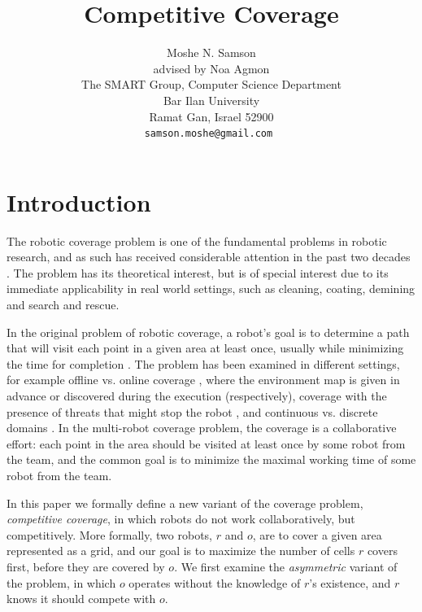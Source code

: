 \documentclass[a4paper,10pt]{article}
\newcommand\rob{\ensuremath{r}\xspace}
\newcommand\opp{\ensuremath{o}\xspace}
\begin{document}
\title{Competitive Coverage}
\author{Moshe N. Samson\\
advised by Noa Agmon\\
The SMART Group, Computer Science Department\\
Bar Ilan University\\
Ramat Gan, Israel 52900\\
\tt\small samson.moshe@gmail.com
}



\tableofcontents
\maketitle

\section{Introduction}
The robotic coverage problem is one of the fundamental problems in robotic research, and as such has received considerable attention in the past two decades \cite{galceran2013survey}. The problem has its theoretical interest, but is of special interest due to its immediate applicability in real world settings, such as cleaning, coating, demining and search and rescue. 

In the original problem of robotic coverage, a robot's goal is to determine a path that will visit each point in a given area at least once, usually while minimizing the time for completion \cite{galceran2013survey}. The problem has been examined in different settings, for example offline vs. online coverage \cite{gabriely2001spanning,agmon2008giving}, where the environment map is given in advance or discovered during the execution (respectively), coverage with the presence of threats that might stop the robot \cite{yehoshua2014safest}, and continuous vs. discrete domains \cite{gabriely2001spanning,yang2004neural}. In the multi-robot coverage problem, the coverage is a collaborative effort: each point in the area should be visited at least once by some robot from the team, and the common goal is to minimize the maximal working time of some robot from the team. 

In this paper we formally define a new variant of the coverage problem, {\em competitive coverage}, in which robots do not work collaboratively, but competitively. More formally, two robots, \rob and \opp, are to cover a given area represented as a grid, and our goal is to maximize the number of cells \rob covers first, before they are covered by \opp. We first examine the {\em asymmetric} variant of the problem, in which \opp operates without the knowledge of \rob's existence, and \rob knows it should compete with \opp. 
\end{document}
